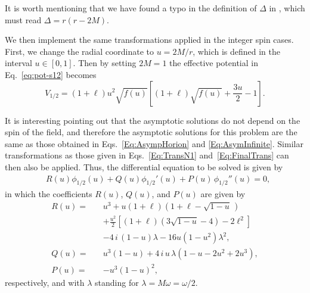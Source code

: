 It is worth mentioning that we have found a typo in the definition of $\Delta$ in \cite{Cho:2003qe}, which must read $\Delta=r(r-2M)$.

We then implement the same transformations applied in the integer spin cases. First, we change the radial coordinate to $u=2M/r$, which is defined in the interval $u\in[0,1]$. Then by setting $2M=1$ the effective potential in Eq.~\eqref{eq:pot-s12} becomes
%
\begin{equation}
  \!\!V_{\scriptscriptstyle{1/2}}=\left(1+\ell\right)u^2\sqrt{f(u)} \left[\left(1+\ell\right)\sqrt{f(u)}+\frac{3u}{2} -1\right].
\end{equation}

It is interesting pointing out that the asymptotic solutions do not depend on the spin of the field, and therefore the asymptotic solutions for this problem are the same as those obtained in Eqs.~\eqref{Eq:AsympHorion} and \eqref{Eq:AsymInfinite}. Similar transformations as those given in Eqs.~\eqref{Eq:TransN1} and~\eqref{Eq:FinalTrans} can then also be applied. Thus, the differential equation to be solved is given by
%
\begin{equation}\label{eq:onda-s12}
  \begin{split}
    &R(u)\phi_{\scriptscriptstyle{1/2}}(u) + Q(u)\phi_{\scriptscriptstyle{1/2}}'(u) + P(u) \,\phi_{\scriptscriptstyle{1/2}}''(u)=0,
  \end{split}
\end{equation}
%
in which the coefficients $R(u)$, $Q(u)$, and $P(u)$ are given by
%
\begin{eqnarray}
  R(u)=\,&& u^3+u(1+\ell)\left(1+\ell-\sqrt{1-u}\, \right) \nonumber \\
  && +\frac{u^2}{2}\left[(1+\ell)\left(3\sqrt{1-u}-4\right)-2\ell^2\right]\nonumber \\
  &&-4\,i\,(1-u)\lambda-16u(1-u^2)\lambda^2,\\
  Q(u) = && u^3(1-u)+4\,i\,u\, \lambda\left(1-u-2u^2+2u^3\right), \\
  P(u)  =&& -u^3(1-u)^2,
\end{eqnarray}
%
respectively, and with $\lambda$ standing for $\lambda=M\omega=\omega/2$.

